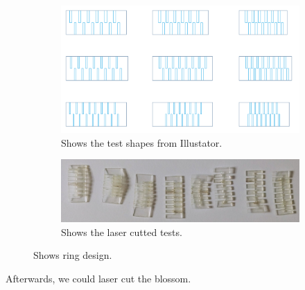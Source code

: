 \documentclass[doc.tex]{subfiles}
\begin{document}
        \begin{figure}[ht!]
            \centering
            \begin{subfigure}{.5\textwidth}
              \centering
              \includegraphics[width=.8\linewidth]{images/process/test_shapes.PNG}
              \caption{Shows the test shapes from Illustator.}
              \label{fig:test_shapes}
            \end{subfigure}%
            \begin{subfigure}{.5\textwidth}
              \centering
              \includegraphics[width=.8\linewidth]{images/process/laserCutTests.jpg}
              \caption{Shows the laser cutted tests.}
              \label{fig:ringdesign2}
            \end{subfigure}
            \caption{Shows ring design.}
            \label{fig:laserCutTests}
        \end{figure}

        Afterwards, we could laser cut the blossom.
        
\end{document}
